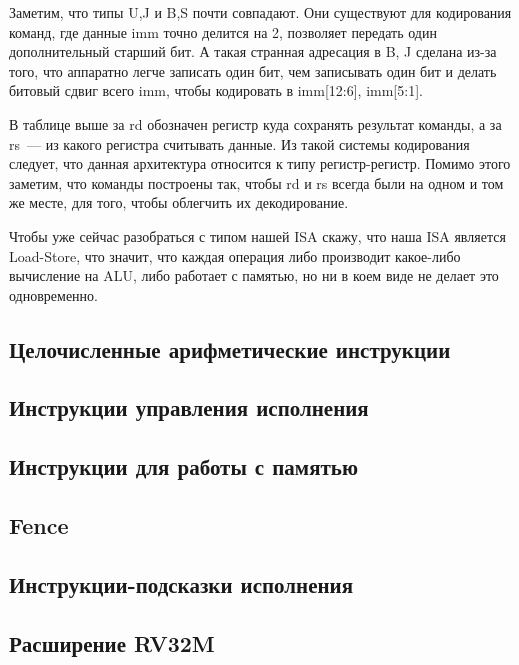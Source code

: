 \documentclass[14pt, russian, onesize]{extreport}
\begin{document}
Заметим, что типы U,J и B,S почти совпадают. Они существуют для кодирования
команд, где данные imm точно делится на 2, позволяет передать один
дополнительный старший бит. А такая странная адресация в B, J сделана
из-за того, что аппаратно легче записать один бит, чем записывать
один бит и делать битовый сдвиг всего imm, чтобы кодировать в imm[12:6], imm[5:1].

В таблице выше за rd обозначен регистр
куда сохранять результат команды, а за rs~--- из какого регистра считывать данные.
Из такой системы  кодирования следует,
что данная архитектура относится к типу регистр-регистр. 
Помимо этого заметим, что команды построены так, чтобы rd и rs всегда
были на одном и том же месте, для того, чтобы облегчить их декодирование.

Чтобы уже сейчас разобраться с типом нашей ISA скажу, что наша ISA 
является Load-Store, что значит, что каждая операция либо производит
какое-либо вычисление на ALU, либо работает с памятью, но ни в коем
виде не делает это одновременно.

\subsection*{Целочисленные арифметические инструкции}

\subsection*{Инструкции управления исполнения}

\subsection*{Инструкции для работы с памятью}

\subsection*{Fence}

\subsection*{Инструкции-подсказки исполнения}

\subsection*{Расширение RV32M}

\end{document}
